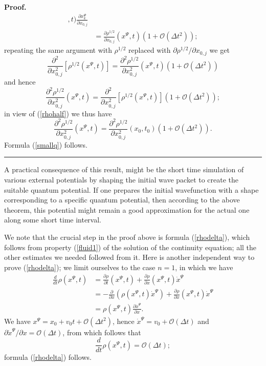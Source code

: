 \documentclass[12pt]{article}%
\newenvironment{proof}[1][Proof]{\noindent\textbf{#1.} }{\ \rule{0.5em}{0.5em}}
\begin{document}
\begin{proof}
\begin{align*}
,t)\frac{\partial x_{k}^{\Psi}}{\partial x_{0,j}}\\
&  =\frac{\partial\rho^{1/2}}{\partial x_{0,j}}(x^{\Psi},t)(1+\mathcal{O}%
(\Delta t^{2}));
\end{align*}
repeating the same argument with $\rho^{1/2}$ replaced with $\partial
\rho^{1/2}/\partial x_{0,j}$ we get%
\[
\frac{\partial^{2}}{\partial x_{0,j}^{2}}\left[  \rho^{1/2}(x^{\Psi
},t)\right]  =\frac{\partial^{2}\rho^{1/2}}{\partial x_{0,j}^{2}}(x^{\Psi
},t)(1+\mathcal{O}(\Delta t^{2}))
\]
and hence
\[
\frac{\partial^{2}\rho^{1/2}}{\partial x_{0,j}^{2}}(x^{\Psi},t)=\frac
{\partial^{2}}{\partial x_{0,j}^{2}}\left[  \rho^{1/2}(x^{\Psi},t)\right]
(1+\mathcal{O}(\Delta t^{2}));
\]
in view of (\ref{rhohalf}) we thus have%
\[
\frac{\partial^{2}\rho^{1/2}}{\partial x_{0,j}^{2}}(x^{\Psi},t)=\frac
{\partial^{2}\rho^{1/2}}{\partial x_{0,j}^{2}}(x_{0},t_{0})(1+\mathcal{O}%
(\Delta t^{2})).
\]
Formula (\ref{smallq}) follows.
\end{proof}

A practical consequence of this result, might be the short time simulation of
various external potentials by shaping the initial wave packet to create the
suitable quantum potential. If one prepares the initial wavefunction with a
shape corresponding to a specific quantum potential, then according to the
above theorem, this potential might remain a good approximation for the actual
one along some short time interval.

We note that the crucial step in the proof above is formula (\ref{rhodelta}),
which follows from property (\ref{fluid1}) of the solution of the continuity
equation; all the other estimates we needed followed from it. Here is another
independent way to prove (\ref{rhodelta}); we limit ourselves to the case
$n=1$, in which we have%
\begin{align*}
\frac{d}{dt}\rho(x^{\Psi},t)  &  =\frac{\partial\rho}{\partial t}(x^{\Psi
},t)+\frac{\partial\rho}{\partial x}(x^{\Psi},t)\dot{x}^{\Psi}\\
&  =-\frac{\partial}{\partial x}(\rho(x^{\Psi},t)\dot{x}^{\Psi})+\frac
{\partial\rho}{\partial x}(x^{\Psi},t)\dot{x}^{\Psi}\\
&  =\rho(x^{\Psi},t)\frac{\partial\dot{x}^{\Psi}}{\partial x}.
\end{align*}
We have $x^{\Psi}=x_{0}+v_{0}t+\mathcal{O}(\Delta t^{2})$, hence $\dot
{x}^{\Psi}=v_{0}+\mathcal{O}(\Delta t)$ and $\partial\dot{x}^{\Psi}/\partial
x=\mathcal{O}(\Delta t)$, from which follows that%
\[
\frac{d}{dt}\rho(x^{\Psi},t)=\mathcal{O}(\Delta t);
\]
formula (\ref{rhodelta}) follows.
\end{document}
